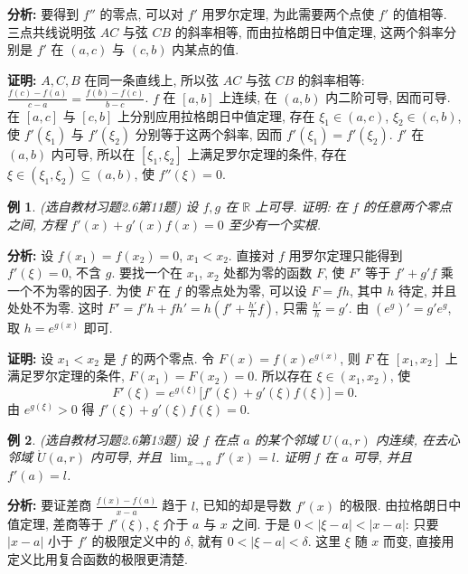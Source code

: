 \documentclass[UTF8,openany]{ctexbook}
\theoremstyle{chinesetextbook}
\newtheorem{example}{例}[section]
\newenvironment{cnproof}{\par\indent\textbf{证明:} \ignorespaces}{\par}
\begin{document}
\par\indent\textbf{分析:} 要得到 $f''$ 的零点, 可以对 $f'$ 用罗尔定理, 为此需要两个点使 $f'$ 的值相等. 三点共线说明弦 $AC$ 与弦 $CB$ 的斜率相等, 而由拉格朗日中值定理, 这两个斜率分别是 $f'$ 在 $(a,c)$ 与 $(c,b)$ 内某点的值.
\begin{cnproof}
$A,C,B$ 在同一条直线上, 所以弦 $AC$ 与弦 $CB$ 的斜率相等: $\displaystyle\frac{f(c)-f(a)}{c-a}=\frac{f(b)-f(c)}{b-c}$. $f$ 在 $[a,b]$ 上连续, 在 $(a,b)$ 内二阶可导, 因而可导. 在 $[a,c]$ 与 $[c,b]$ 上分别应用拉格朗日中值定理, 存在 $\xi_1\in(a,c)$, $\xi_2\in(c,b)$, 使 $f'(\xi_1)$ 与 $f'(\xi_2)$ 分别等于这两个斜率, 因而 $f'(\xi_1)=f'(\xi_2)$. $f'$ 在 $(a,b)$ 内可导, 所以在 $[\xi_1,\xi_2]$ 上满足罗尔定理的条件, 存在 $\xi\in(\xi_1,\xi_2)\subseteq(a,b)$, 使 $f''(\xi)=0$.
\end{cnproof}
\begin{example}\label{ex:c2-h6-11}
\textnormal{(选自教材习题2.6第11题)} 设 $f,g$ 在 $\mathbb R$ 上可导. 证明: 在 $f$ 的任意两个零点之间, 方程 $f'(x)+g'(x)f(x)=0$ 至少有一个实根.
\end{example}
\par\indent\textbf{分析:} 设 $f(x_1)=f(x_2)=0$, $x_1<x_2$. 直接对 $f$ 用罗尔定理只能得到 $f'(\xi)=0$, 不含 $g$. 要找一个在 $x_1$, $x_2$ 处都为零的函数 $F$, 使 $F'$ 等于 $f'+g'f$ 乘一个不为零的因子. 为使 $F$ 在 $f$ 的零点处为零, 可以设 $F=fh$, 其中 $h$ 待定, 并且处处不为零. 这时 $\displaystyle F'=f'h+fh'=h\left(f'+\frac{h'}hf\right)$, 只需 $\displaystyle\frac{h'}h=g'$. 由 $(e^{g})'=g'e^{g}$, 取 $h=e^{g(x)}$ 即可.
\begin{cnproof}
设 $x_1<x_2$ 是 $f$ 的两个零点. 令 $F(x)=f(x)e^{g(x)}$, 则 $F$ 在 $[x_1,x_2]$ 上满足罗尔定理的条件, $F(x_1)=F(x_2)=0$. 所以存在 $\xi\in(x_1,x_2)$, 使
\[
F'(\xi)=e^{g(\xi)}\bigl[f'(\xi)+g'(\xi)f(\xi)\bigr]=0.
\]
由 $e^{g(\xi)}>0$ 得 $f'(\xi)+g'(\xi)f(\xi)=0$.
\end{cnproof}
\begin{example}\label{ex:c2-h6-13}
\textnormal{(选自教材习题2.6第13题)} 设 $f$ 在点 $a$ 的某个邻域 $U(a,r)$ 内连续, 在去心邻域 $\mathring U(a,r)$ 内可导, 并且 $\displaystyle\lim_{x\to a}f'(x)=l$. 证明 $f$ 在 $a$ 可导, 并且 $f'(a)=l$.
\end{example}
\par\indent\textbf{分析:} 要证差商 $\displaystyle\frac{f(x)-f(a)}{x-a}$ 趋于 $l$, 已知的却是导数 $f'(x)$ 的极限. 由拉格朗日中值定理, 差商等于 $f'(\xi)$, $\xi$ 介于 $a$ 与 $x$ 之间. 于是 $0<|\xi-a|<|x-a|$: 只要 $|x-a|$ 小于 $f'$ 的极限定义中的 $\delta$, 就有 $0<|\xi-a|<\delta$. 这里 $\xi$ 随 $x$ 而变, 直接用定义比用复合函数的极限更清楚.
\end{document}
